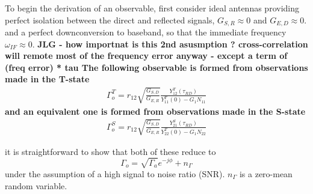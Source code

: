 \documentclass[draftcls,onecolumn]{IEEEtran}  %
\begin{document}
To begin the derivation of an observable, first consider  ideal antennas providing perfect isolation between the direct and reflected signals, 
 $G_{S,R}\approx 0 $ and $G_{E,D}\approx 0$. 
and  a perfect downconversion to baseband, so that the immediate frequency $\omega_{IF} \approx 0$. 
\bf JLG - how importnat is this 2nd asusmption ? cross-correlation will remote most of the frequency error anyway - except a term of (freq error) * tau \rm
The following observable is formed from observations made in the T-state
\begin{eqnarray}
 \Gamma_o^T =	r_{12} \sqrt{\frac{G_{S,D}}{G_{E,R}}} \frac{Y_{12}^T(\tau_{RD})} {Y_{11}^T(0)-G_1 N_{11}}  
    \label{Eq:Gamma_estimation_approx}
% 
% 
\end{eqnarray}
and an equivalent one is formed from observations made in the S-state
\begin{eqnarray}
 \Gamma_o^S =	r_{12} \sqrt{\frac{G_{S,D}}{G_{E,R}}} \frac{Y_{21}^S(\tau_{RD})} {Y_{22}^T(0)-G_1 N_{22}}  
    \label{Eq:Gamma_estimation_approx}
% 
% 
\end{eqnarray}
% 
% 
% 

it is straightforward to show that both of these reduce to 
\begin{equation}
    \Gamma_{o} = \sqrt{\Gamma_a} e^{-j \phi} + n_\Gamma
    \label{Eq:Gamma_estimation_approx}
\end{equation}
under the assumption of a high signal to noise ratio (SNR). 
 $n_\Gamma$ is a zero-mean random variable. 
\end{document}
